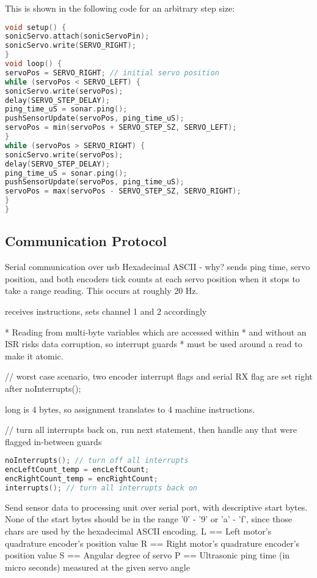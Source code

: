 This is shown in the following code for an arbitrary step size:
\begin{mdframed}[backgroundcolor=light-gray, roundcorner=10pt,leftmargin=1, rightmargin=1, innerleftmargin=15, innertopmargin=15,innerbottommargin=15, outerlinewidth=1, linecolor=light-gray]
\begin{lstlisting}[language=C++]
void setup() {
sonicServo.attach(sonicServoPin);
sonicServo.write(SERVO_RIGHT);
}
void loop() {
servoPos = SERVO_RIGHT; // initial servo position
while (servoPos < SERVO_LEFT) {
sonicServo.write(servoPos);
delay(SERVO_STEP_DELAY); 
ping_time_uS = sonar.ping();
pushSensorUpdate(servoPos, ping_time_uS);
servoPos = min(servoPos + SERVO_STEP_SZ, SERVO_LEFT);
}
while (servoPos > SERVO_RIGHT) {
sonicServo.write(servoPos);
delay(SERVO_STEP_DELAY); 
ping_time_uS = sonar.ping(); 
pushSensorUpdate(servoPos, ping_time_uS);
servoPos = max(servoPos - SERVO_STEP_SZ, SERVO_RIGHT);
}
}
\end{lstlisting}
\end{mdframed}


\subsection{Communication Protocol}
Serial communication over usb
Hexadecimal ASCII - why?
sends ping time, servo position, and both encoders tick counts at each servo position when it stops to take a range reading. This occurs at roughly 20 Hz.

receives instructions, sets channel 1 and 2 accordingly


* Reading from multi-byte variables which are accessed within
* and without an ISR risks data corruption, so interrupt guards
* must be used around a read to make it atomic.

// worst case scenario, two encoder interrupt flags and serial RX flag are set right after noInterrupts();

long is 4 bytes, so assignment translates to 4 machine instructions.

// turn all interrupts back on, run next statement, then handle any that were flagged in-between guards
\begin{mdframed}[backgroundcolor=light-gray, roundcorner=10pt,leftmargin=1, rightmargin=1, innerleftmargin=15, innertopmargin=15,innerbottommargin=15, outerlinewidth=1, linecolor=light-gray]
	\begin{lstlisting}[language=C++]
noInterrupts(); // turn off all interrupts
encLeftCount_temp = encLeftCount;
encRightCount_temp = encRightCount;
interrupts(); // turn all interrupts back on
	\end{lstlisting}
\end{mdframed}

Send sensor data to processing unit over serial port, with descriptive start bytes.
None of the start bytes should be in the range '0' - '9' or 'a' - 'f', since those 
chars are used by the hexadecimal ASCII encoding.
L == Left motor's quadrature encoder's position value
R == Right motor's quadrature encoder's position value
S == Angular degree of servo
P == Ultrasonic ping time (in micro seconds) measured at the given servo angle